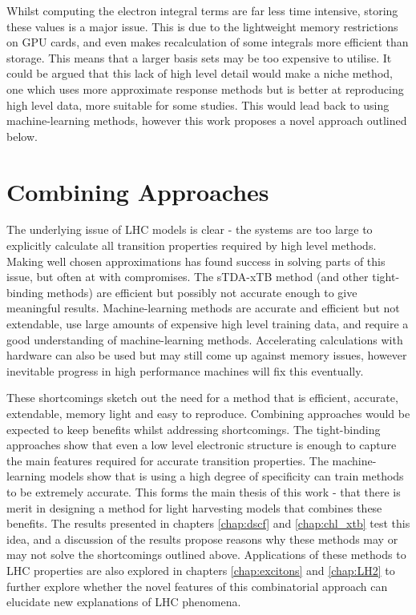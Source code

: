 Whilst computing the electron integral terms are far less time intensive, storing
these values is a major issue. This is due to the lightweight memory restrictions
on GPU cards, and even makes recalculation of some integrals more efficient than
storage. This means that a larger basis sets may be too expensive to utilise. It
could be argued that this lack of high level detail would make a niche method, one
which uses more approximate response methods but is better at reproducing high level
data, more suitable for some studies. This would lead back to using machine-learning
methods, however this work proposes a novel approach outlined below.

\section{Combining Approaches}
\label{sec:possible_novel_methods}

The underlying issue of LHC models is clear - the systems are too large to explicitly
calculate all transition properties required by high level methods. Making well 
chosen approximations has found success in solving parts of this issue, but often
at with compromises. The sTDA-xTB method (and other tight-binding methods) are efficient
but possibly not accurate enough to give meaningful results. Machine-learning methods
are accurate and efficient but not extendable, use large amounts of expensive high
level training data, and require a good understanding of machine-learning methods.
Accelerating calculations with hardware can also be used but may still come up against
memory issues, however inevitable progress in high performance machines will fix 
this eventually.

These shortcomings sketch out the need for a method that is efficient, accurate,
extendable, memory light and easy to reproduce. Combining approaches would be expected
to keep benefits whilst addressing shortcomings. The tight-binding approaches show
that even a low level electronic structure is enough to capture the main features
required for accurate transition properties. The machine-learning models show that
is using a high degree of specificity can train methods to be extremely accurate.
This forms the main thesis of this work - that there is merit in designing a method
for light harvesting models that combines these benefits. The results presented in 
chapters \ref{chap:dscf} and \ref{chap:chl_xtb} test this idea, and a discussion
of the results propose reasons why these methods may or may not solve the shortcomings
outlined above. Applications of these methods to LHC properties are also explored
in chapters \ref{chap:excitons} and \ref{chap:LH2} to further explore whether the
novel features of this combinatorial approach can elucidate new explanations of
LHC phenomena.